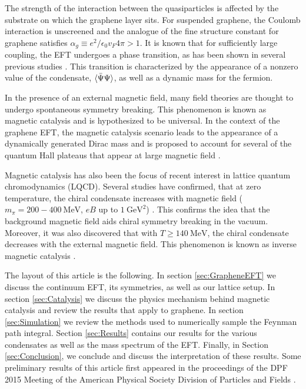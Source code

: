 \documentclass[aps,prd,twocolumn,showpacs,superscriptaddress,groupedaddress]{revtex4}  %
\begin{document}
The strength of the interaction between the quasiparticles is affected by the substrate on which the graphene layer sits. For suspended graphene, the Coulomb interaction is unscreened
and the analogue of the fine structure constant for graphene satisfies $\alpha_g \equiv e^2/\epsilon_0 v_F 4\pi > 1$. It is known that for sufficiently large coupling, the EFT undergoes a phase transition, as has been shown in 
several previous studies \cite{Drut1, Drut2, Hands1, Hands2}. This transition is characterized by the appearance of a nonzero value of the condensate, ${\langle {\bar \Psi} \Psi \rangle}$, as well as a dynamic mass
for the fermion.

In the presence of an external magnetic field, many field theories are thought to undergo spontaneous symmetry breaking. This phenomenon is known as magnetic catalysis and is hypothesized to be universal. In the context of the graphene EFT, the magnetic
catalysis scenario leads to the appearance of a dynamically generated Dirac mass and is proposed to account for several of the quantum Hall plateaus that appear at large magnetic field \cite{ZhangQHE,JiangQHE}.

Magnetic catalysis has also been the focus of recent interest in lattice quantum chromodynamics (LQCD). Several studies have confirmed, that at zero temperature, the chiral condensate
increases with magnetic field ($m_{\pi} = 200-400 ~\text{MeV}$, $eB$ up to $1 ~\text{GeV}^2$) \cite{Buividovich,Braguta}. This confirms the idea that the background magnetic field aids chiral symmetry breaking in the vacuum.
Moreover, it was also discovered that with $T \geq 140 ~\text{MeV}$, the chiral condensate decreases with the external magnetic field. This phenomenon is known as inverse magnetic catalysis \cite{Bali1,Bali2}.

The layout of this article is the following. In section \ref{sec:GrapheneEFT} we discuss the continuum EFT, its symmetries, as well as our lattice setup.
In section \ref{sec:Catalysis} we discuss the physics mechanism behind magnetic catalysis and review the results that apply to graphene. In section \ref{sec:Simulation} we review the methods used to numerically sample the Feynman path integral. Section \ref{sec:Results} contains our results for the various condensates as well as the mass spectrum of the EFT.
Finally, in Section \ref{sec:Conclusion}, we conclude and discuss the interpretation of these results. Some preliminary results of this article first appeared in the proceedings of the DPF 2015 Meeting of the American Physical Society Division of Particles and Fields \cite{DPF2015}.
\end{document}
